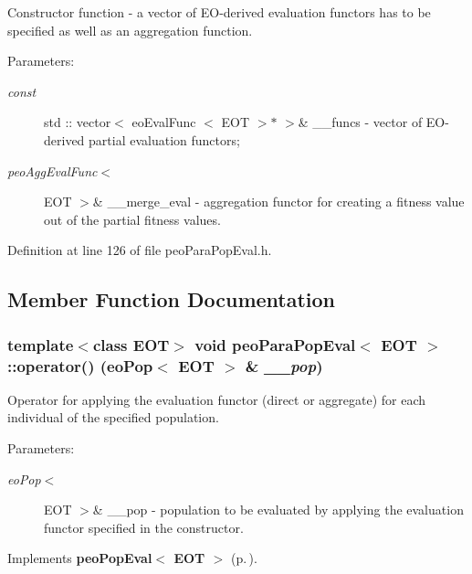 Constructor function - a vector of EO-derived evaluation functors has to be specified as well as an aggregation function. 

\begin{Desc}
\item[Parameters:]
\begin{description}
\item[{\em const}]std :: vector$<$ eo\-Eval\-Func $<$ EOT $>$$\ast$ $>$\& \_\-\_\-funcs - vector of EO-derived partial evaluation functors; \item[{\em peo\-Agg\-Eval\-Func$<$}]EOT $>$\& \_\-\_\-merge\_\-eval - aggregation functor for creating a fitness value out of the partial fitness values. \end{description}
\end{Desc}


Definition at line 126 of file peo\-Para\-Pop\-Eval.h.

\subsection{Member Function Documentation}
\subsubsection{\setlength{\rightskip}{0pt plus 5cm}template$<$class EOT$>$ void {\bf peo\-Para\-Pop\-Eval}$<$ EOT $>$::operator() (eo\-Pop$<$ EOT $>$ \& {\em \_\-\_\-pop})\hspace{0.3cm}{\tt  [virtual]}}\label{classpeo_para_pop_eval_aeaa4fca4f8650e453e308838b4a2cb5}


Operator for applying the evaluation functor (direct or aggregate) for each individual of the specified population. 

\begin{Desc}
\item[Parameters:]
\begin{description}
\item[{\em eo\-Pop$<$}]EOT $>$\& \_\-\_\-pop - population to be evaluated by applying the evaluation functor specified in the constructor. \end{description}
\end{Desc}


Implements {\bf peo\-Pop\-Eval$<$ EOT $>$} {\rm (p.\,\pageref{classpeo_pop_eval_2f208067a5e39c3b26c1234050a41e8f})}.

